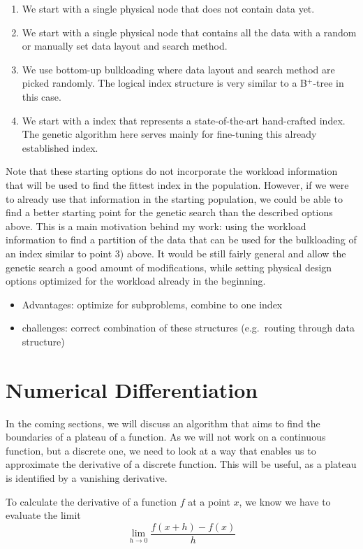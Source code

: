 \begin{enumerate}
    \item We start with a single physical node that does not contain data yet.
    \item We start with a single physical node that contains all the data with a random or manually set data layout and search method.
    \item We use bottom-up bulkloading where data layout and search method are picked randomly. The logical index structure is very similar to a B$^+$-tree in this case.
    \item We start with a index that represents a state-of-the-art hand-crafted index. The genetic algorithm here serves mainly for fine-tuning this already established index.
\end{enumerate}
\noindent Note that these starting options do not incorporate the workload information that will be used to find the fittest index in the population. However, if we were to already use that information in the starting population, we could be able to find a better starting point for the genetic search than the described options above. This is a main motivation behind my work: using the workload information to find a partition of the data that can be used for the bulkloading of an index similar to point 3) above. It would be still fairly general and allow the genetic search a good amount of modifications, while setting physical design options optimized for the workload already in the beginning.

\begin{itemize}
    \item Advantages: optimize for subproblems, combine to one index
    \item challenges: correct combination of these structures (e.g.~routing through data structure)
\end{itemize}


\section{Numerical Differentiation}\label{bg:numerical}
In the coming sections, we will discuss an algorithm that aims to find the boundaries of a plateau of a function. As we will not work on a continuous function, but a discrete one, we need to look at a way that enables us to approximate the derivative of a discrete function. This will be useful, as a plateau is identified by a vanishing derivative.

To calculate the derivative of a function $f$ at a point $x$, we know we have to evaluate the limit 
$$
\lim_{h \rightarrow 0} \frac{f(x+h) - f(x)}{h}
$$

